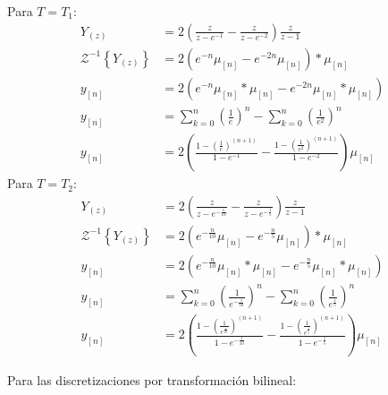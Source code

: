 \documentclass[a4paper,12pt]{report}
\begin{document}
\begin{enumerate}[label=\alph*), left=0pt]
                Para $T = T_1$:
                \begin{align*}
                    Y_{(z)} &= 2\left(\frac{z}{z - e^{-1}} - \frac{z}{z - e^{-2}} \right) \frac{z}{z-1}\\
                    \mathcal{Z}^{-1}\left\{Y_{(z)}\right\} &= 2\left(e^{-n} \mu_{[n]} - e^{-2 n} \mu_{[n]}\right) * \mu_{[n]}\\
                    y_{[n]} &= 2\left(e^{-n} \mu_{[n]} * \mu_{[n]} - e^{-2 n} \mu_{[n]} * \mu_{[n]}\right)\\
                    y_{[n]} &= \sum_{k=0}^n \left(\frac{1}{e}\right)^{n} - \sum_{k=0}^n \left(\frac{1}{e^2}\right)^{n}\\
                    y_{[n]} &= 2\left( \frac{1 - \left(\frac{1}{e}\right)^{(n+1)}}{1 - e^{-1}} - \frac{1 - \left(\frac{1}{e^2}\right)^{(n+1)}}{1 - e^{-2}} \right) \mu_{[n]}
                \end{align*}
                Para $T = T_2$:
                \begin{align*}
                    Y_{(z)} &= 2\left(\frac{z}{z - e^{-\frac{1}{10}}} - \frac{z}{z - e^{-\frac{1}{5}}} \right) \frac{z}{z-1}\\
                    \mathcal{Z}^{-1}\left\{Y_{(z)}\right\} &= 2\left(e^{-\frac{n}{10}} \mu_{[n]} - e^{-\frac{n}{5}} \mu_{[n]}\right) * \mu_{[n]}\\
                    y_{[n]} &= 2\left(e^{-\frac{n}{10}} \mu_{[n]} * \mu_{[n]} - e^{-\frac{n}{5}} \mu_{[n]} * \mu_{[n]}\right)\\
                    y_{[n]} &= \sum_{k=0}^n \left(\frac{1}{e^{-\frac{1}{10}}}\right)^{n} - \sum_{k=0}^n \left(\frac{1}{e^{\frac{1}{5}}}\right)^{n}\\
                    y_{[n]} &= 2\left( \frac{1 - \left(\frac{1}{e^{\frac{1}{10}}}\right)^{(n+1)}}{1 - e^{-{\frac{1}{10}}}} - \frac{1 - \left(\frac{1}{e^{\frac{1}{5}}}\right)^{(n+1)}}{1 - e^{-\frac{1}{5}}} \right) \mu_{[n]}
                \end{align*}

                Para las discretizaciones por transformación bilineal:


\end{enumerate}
\end{document}
